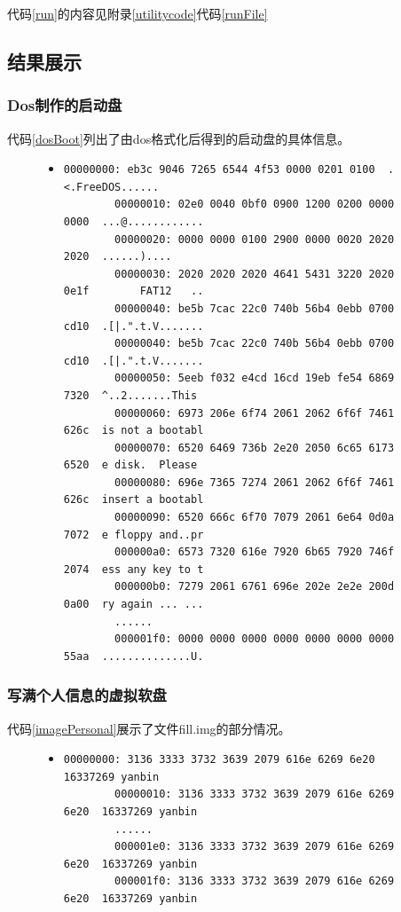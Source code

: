 \documentclass[a4paper]{article}
\begin{document}
    代码\ref{run}的内容见附录\ref{utilitycode}代码\ref{runFile}

    \subsection{结果展示}\label{result}
    \subsubsection{Dos制作的启动盘}
    代码\ref{dosBoot}列出了由dos格式化后得到的启动盘的具体信息。
    \begin{figure}
    \begin{itemize}
    \item[] \begin{lstlisting}[label=dosBoot, caption=Dos下制作的引导盘a.img的部分内容]
        00000000: eb3c 9046 7265 6544 4f53 0000 0201 0100  .<.FreeDOS......
        00000010: 02e0 0040 0bf0 0900 1200 0200 0000 0000  ...@............
        00000020: 0000 0000 0100 2900 0000 0020 2020 2020  ......)....
        00000030: 2020 2020 2020 4641 5431 3220 2020 0e1f        FAT12   ..
        00000040: be5b 7cac 22c0 740b 56b4 0ebb 0700 cd10  .[|.".t.V.......
        00000040: be5b 7cac 22c0 740b 56b4 0ebb 0700 cd10  .[|.".t.V.......
        00000050: 5eeb f032 e4cd 16cd 19eb fe54 6869 7320  ^..2.......This
        00000060: 6973 206e 6f74 2061 2062 6f6f 7461 626c  is not a bootabl
        00000070: 6520 6469 736b 2e20 2050 6c65 6173 6520  e disk.  Please
        00000080: 696e 7365 7274 2061 2062 6f6f 7461 626c  insert a bootabl
        00000090: 6520 666c 6f70 7079 2061 6e64 0d0a 7072  e floppy and..pr
        000000a0: 6573 7320 616e 7920 6b65 7920 746f 2074  ess any key to t
        000000b0: 7279 2061 6761 696e 202e 2e2e 200d 0a00  ry again ... ...
        ......
        000001f0: 0000 0000 0000 0000 0000 0000 0000 55aa  ..............U.
    \end{lstlisting}
    \end{itemize}
    \end{figure}

    \subsubsection{写满个人信息的虚拟软盘}
    代码\ref{imagePersonal}展示了文件fill.img的部分情况。\\
    
    \begin{figure}
    \begin{itemize}
    \item[] \begin{lstlisting}[label=imagePersonal, caption=节选自fill.img]
        00000000: 3136 3333 3732 3639 2079 616e 6269 6e20  16337269 yanbin
        00000010: 3136 3333 3732 3639 2079 616e 6269 6e20  16337269 yanbin
        ......
        000001e0: 3136 3333 3732 3639 2079 616e 6269 6e20  16337269 yanbin
        000001f0: 3136 3333 3732 3639 2079 616e 6269 6e20  16337269 yanbin
    \end{lstlisting}
    \end{itemize}
    \end{figure}
    
\end{document}

